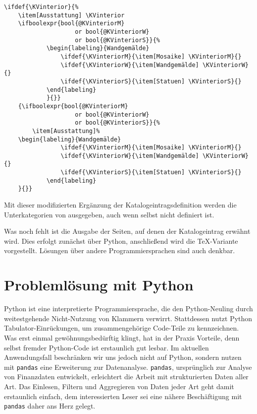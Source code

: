 \documentclass[ngerman]{dtk}
\begin{document}
\begin{lstlisting}[style=number,caption={Einsetzten der Booleschen Operatoren in den Katalogeintrag},label={lis:cat-bool3}]
\ifdef{\KVinterior}{%
	\item[Ausstattung] \KVinterior 
	\ifboolexpr{bool{@KVinteriorM} 
					or bool{@KVinteriorW} 
					or bool{@KVinteriorS}}{%
			\begin{labeling}{Wandgemälde}
				\ifdef{\KVinteriorM}{\item[Mosaike] \KVinteriorM}{}
				\ifdef{\KVinteriorW}{\item[Wandgemälde] \KVinteriorW}{}
				\ifdef{\KVinteriorS}{\item[Statuen] \KVinteriorS}{}
			\end{labeling}
			}{}}
	{\ifboolexpr{bool{@KVinteriorM} 
					or bool{@KVinteriorW} 
					or bool{@KVinteriorS}}{%
		\item[Ausstattung]%
	\begin{labeling}{Wandgemälde}	
				\ifdef{\KVinteriorM}{\item[Mosaike] \KVinteriorM}{}
				\ifdef{\KVinteriorW}{\item[Wandgemälde] \KVinteriorW}{}
				\ifdef{\KVinteriorS}{\item[Statuen] \KVinteriorS}{}
			\end{labeling}
	}{}}
\end{lstlisting}
Mit dieser modifizierten Ergänzung der Katalogeintragsdefinition werden die Unterkategorien von  ausgegeben, 
auch wenn  selbst nicht definiert ist.


Was noch fehlt ist die Ausgabe der Seiten, auf denen der Katalogeintrag
 erwähnt wird. 
Dies erfolgt zunächst über Python, 
anschließend wird die \TeX -Variante vorgestellt.
Lösungen über andere Programmiersprachen sind auch denkbar.

\section{Problemlösung mit Python}
Python ist eine interpretierte Programmiersprache, die den Python-Neuling
durch weitestgehende Nicht-Nutzung von Klammern verwirrt. 
Stattdessen nutzt Python Tabulator-Einrückungen, um zusammengehörige 
Code-Teile zu kennzeichnen. Was erst einmal gewöhnungsbedürftig klingt, 
hat in der Praxis Vorteile, denn selbst fremder Python-Code ist erstaunlich gut lesbar. 
Im aktuellen Anwendungsfall beschränken wir uns jedoch nicht auf Python, 
sondern nutzen mit  \verb|pandas| eine Erweiterung zur Datenanalyse. 
\verb|pandas|, ursprünglich zur Analyse von Finanzdaten entwickelt, 
erleichtert die Arbeit mit strukturierten Daten aller Art. 
Das Einlesen, Filtern und Aggregieren von Daten jeder Art geht damit 
erstaunlich einfach, dem interessierten Leser sei eine nähere Beschäftigung 
mit \verb|pandas| daher ans Herz gelegt.
\end{document}
